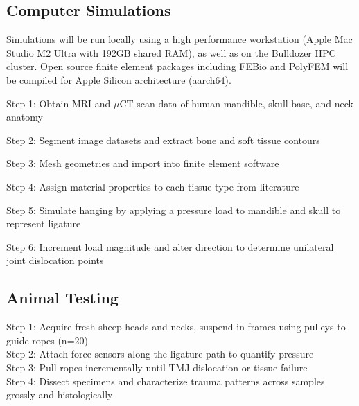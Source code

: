 \documentclass{article}
\begin{document}
\subsection{Computer Simulations}
Simulations will be run locally using a high performance workstation (Apple Mac Studio M2 Ultra with 192GB shared RAM), as well as on the Bulldozer HPC cluster. Open source finite element packages including FEBio and PolyFEM will be compiled for Apple Silicon architecture (aarch64).

\begin{outline}
    
\1 Step 1: Obtain MRI and $\mu$CT scan data of human mandible, skull base, and neck anatomy

\1 Step 2: Segment image datasets and extract bone and soft tissue contours

\1 Step 3: Mesh geometries and import into finite element software

\1 Step 4: Assign material properties to each tissue type from literature

\1 Step 5: Simulate hanging by applying a pressure load to mandible and skull to represent ligature 

\1 Step 6: Increment load magnitude and alter direction to determine unilateral joint dislocation points

\end{outline}

\subsection{Animal Testing}

\begin{outline}

\1 Step 1: Acquire fresh sheep heads and necks, suspend in frames using pulleys to guide ropes (n=20) \\

\1 Step 2: Attach force sensors along the ligature path to quantify pressure \\

\1 Step 3: Pull ropes incrementally until TMJ dislocation or tissue failure \\

\1 Step 4: Dissect specimens and characterize trauma patterns across samples grossly and histologically\\

\end{outline}
\end{document}
